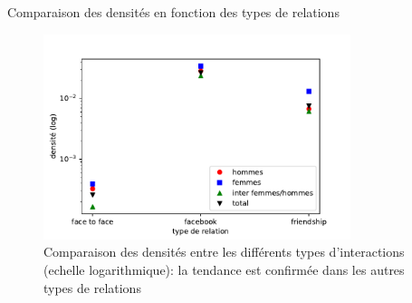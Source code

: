 \documentclass[15pt]{beamer}
\begin{document}
\begin{frame}{Comparaison des densités en fonction des types de relations}
    
    \begin{figure}
        \centering
        \includegraphics[width=0.8\textwidth]{img/comparatif.pdf}
        \caption{Comparaison des densités entre les différents types d'interactions (echelle logarithmique): la tendance est confirmée dans les autres types de relations }
        \label{fig:my_label}
    \end{figure}
\end{frame}
\end{document}
